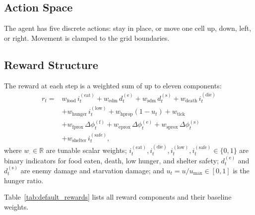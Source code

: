 \documentclass[12pt,a4paper,titlepage]{article}
\begin{document}
\subsection{Action Space}

The agent has five discrete actions: stay in place, or move one cell up, down, left, or right. Movement is clamped to the grid boundaries.

\subsection{Reward Structure}
\label{sec:reward_structure}

The reward at each step is a weighted sum of up to eleven components:
\begin{equation}
\label{eq:reward}
\begin{aligned}
r_t ={}& w_\text{food}\, i_t^{(\text{eat})}
    + w_\text{edm}\, d_t^{(\text{e})}
    + w_\text{sdm}\, d_t^{(\text{s})}
    + w_\text{death}\, i_t^{(\text{die})} \\
& + w_\text{hunger}\, i_t^{(\text{low})}
    + w_\text{hprop}(1 - u_t)
    + w_\text{tick} \\
& + w_\text{fprox}\, \Delta\phi_t^{(\text{f})}
    + w_\text{eprox}\, \Delta\phi_t^{(\text{e})}
    + w_\text{sprox}\, \Delta\phi_t^{(\text{s})} \\
& + w_\text{shelter}\, i_t^{(\text{safe})},
\end{aligned}
\end{equation}
where $w_{\cdot} \in \mathbb{R}$ are tunable scalar weights; $i_t^{(\text{eat})}, i_t^{(\text{die})}, i_t^{(\text{low})}, i_t^{(\text{safe})} \in \{0,1\}$ are binary indicators for food eaten, death, low hunger, and shelter safety; $d_t^{(\text{e})}$ and $d_t^{(\text{s})}$ are enemy damage and starvation damage; and $u_t = u / u_\text{max} \in [0, 1]$ is the hunger ratio.

Table~\ref{tab:default_rewards} lists all reward components and their baseline weights.
\end{document}
